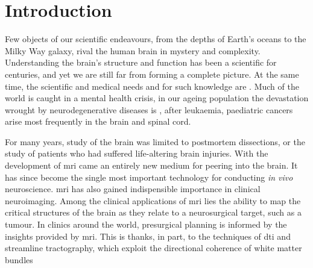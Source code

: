 \chapter*{Introduction}
\label{chapterlabel0}

Few objects of our scientific endeavours, from the depths of Earth's oceans to the Milky Way galaxy, rival the human brain in mystery and complexity.
Understanding the brain's structure and function has been a scientific  for centuries, and yet we are still far from forming a complete picture.
At the same time, the scientific and medical needs and for such knowledge are .
Much of the world is caught in a mental health crisis, in our ageing population the devastation wrought by neurodegenerative diseases is , after leukaemia, paediatric cancers arise most frequently in the brain and spinal cord.\autocite{Ostrom2015}

For many years, study of the brain was limited to postmortem dissections, or the study of patients who had suffered life-altering brain injuries.
With the development of \gls{mri} came an entirely new medium for peering into the brain.
It has since become the single most important  technology for conducting \textit{in vivo} neuroscience.
\Gls{mri} has also gained indispensible importance in clinical neuroimaging.
Among the clinical applications of \gls{mri} lies the ability to map the critical structures of the brain as they relate to a neurosurgical target, such as a tumour.
In clinics around the  world, presurgical planning is informed by the insights provided by  \gls{mri}.
This is thanks, in part, to the techniques of \gls{dti} and streamline tractography, which exploit the directional coherence of white matter bundles 

